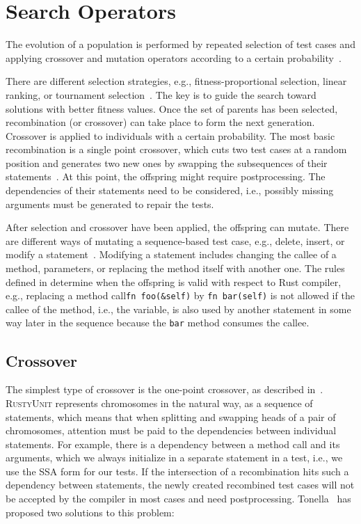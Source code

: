 \documentclass[paper=a4,%
  twoside,%
  BCOR4mm,%
  abstract=true,%
  toc=bibliography,%
  chapterprefix=true,%
  toc=bibliographynumbered,%
  open=right,%
  english,%
  pagesize=pdftex]{scrreprt}
\newcommand{\tech}{\textsc{RustyUnit}\xspace}
\begin{document}
\section{Search Operators}
\label{sec:search-operators}
The evolution of a population is performed by repeated selection of test cases and applying crossover and mutation operators according to a certain probability~\cite{Fraser2012}.

There are different selection strategies, e.g., fitness-proportional selection, linear ranking, or tournament selection~\cite{McMinn_2004}. The key is to guide the search toward solutions with better fitness values. Once the set of parents has been selected, recombination (or crossover) can take place to form the next generation. Crossover is applied to individuals with a certain probability. The most basic recombination is a single point crossover, which cuts two test cases at a random position and generates two new ones by swapping the subsequences of their statements~\cite{Fraser2012}. At this point, the offspring might require postprocessing. The dependencies of their statements need to be considered, i.e., possibly missing arguments must be generated to repair the tests.

After selection and crossover have been applied, the offspring can mutate. There are different ways of mutating a sequence-based test case, e.g., delete, insert, or modify a statement~\cite{Fraser2012}. Modifying a statement includes changing the callee of a method, parameters, or replacing the method itself with another one. The rules defined in  determine when the offspring is valid with respect to Rust compiler, e.g., replacing a method call\texttt{fn foo(\string&self)} by \texttt{fn bar(self)} is not allowed if the callee of the method, i.e., the variable, is also used by another statement in some way later in the sequence because the \texttt{bar} method consumes the callee.

\subsection{Crossover}
The simplest type of crossover is the one-point crossover, as described in~. \tech represents chromosomes in the natural way, as a sequence of statements, which means that when splitting and swapping heads of a pair of chromosomes, attention must be paid to the dependencies between individual statements. For example, there is a dependency between a method call and its arguments, which we always initialize in a separate statement in a test, i.e., we use the \ac{SSA} form for our tests. If the intersection of a recombination hits such a dependency between statements, the newly created recombined test cases will not be accepted by the compiler in most cases and need postprocessing. Tonella~\cite{Tonella2004} has proposed two solutions to this problem:
\end{document}
